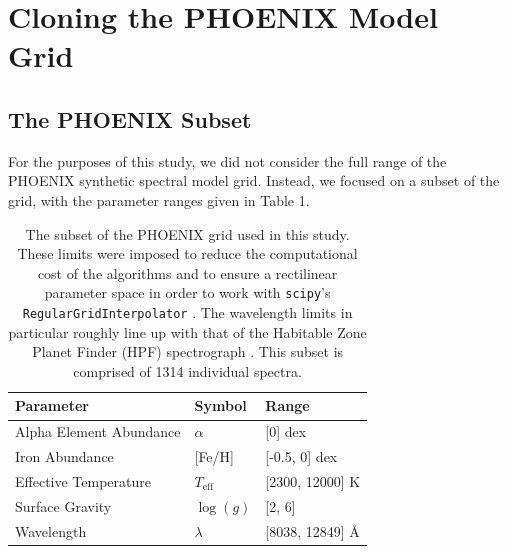 \documentclass[twocolumn]{aastex631}
\begin{document}
\section{Cloning the PHOENIX Model Grid}
\subsection{The PHOENIX Subset}
For the purposes of this study, we did not consider the full range of the
PHOENIX synthetic spectral model grid. Instead, we focused on a subset of 
the grid, with the parameter ranges given in Table 1.

\begin{table}[h!]
    \centering
    \begin{tabular}{lll}
        \hline
        \bf{Parameter} & \bf{Symbol} & \bf{Range}\\
        \hline
        Alpha Element Abundance & $\alpha$ & [0] dex\\
        Iron Abundance & [Fe/H] & [-0.5, 0] dex\\
        Effective Temperature & $T_{\mathrm{eff}}$ & [2300, 12000] K\\
        Surface Gravity & $\log(g)$ & [2, 6]\\
        Wavelength & $\lambda$ & [8038, 12849] \AA\\
        \hline
    \end{tabular}
    \caption{The subset of the PHOENIX grid used in this study. These limits 
    were imposed to reduce the computational cost of the algorithms and to 
    ensure a rectilinear parameter space in order to work with \texttt{scipy}'s
    \texttt{RegularGridInterpolator} \citep{scipy}. The wavelength limits in particular 
    roughly line up with that of the Habitable Zone Planet Finder (HPF) 
    spectrograph \citep{HPF}. This subset is comprised of 1314 individual spectra.}
\end{table}
\end{document}
